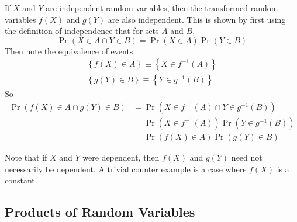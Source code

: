 \documentclass[11pt]{report} %
\begin{document}
If $X$ and $Y$ are independent random variables, then the transformed random variables $f\left(X\right)$ and $g\left(Y\right)$ are also independent. This is shown by first using the definition of independence that for sets $A$ and $B$, 
\begin{equation}
\operatorname{Pr}\left(X \in A \cap Y \in B\right) = \operatorname{Pr}\left(X \in A\right)\operatorname{Pr}\left(Y \in B\right)
\end{equation}
Then note the equivalence of events
\begin{gather}
\left\{f\left(X\right) \in A\right\} \equiv \left\{X \in f^{-1}\left(A\right)\right\} \\
\left\{g\left(Y\right) \in B\right\} \equiv \left\{Y \in g^{-1}\left(B\right)\right\}
\end{gather}
So
\begin{align}
\operatorname{Pr}\left(f\left(X\right) \in A \cap g\left(Y\right) \in B\right) &= \operatorname{Pr}\left(X \in f^{-1}\left(A\right) \cap Y \in g^{-1}\left(B\right)\right) \\
&=  \operatorname{Pr}\left(X \in f^{-1}\left(A\right)\right)\operatorname{Pr}\left(Y \in g^{-1}\left(B\right)\right) \\
&= \operatorname{Pr}\left(f\left(X\right) \in A\right)\operatorname{Pr}\left(g\left(Y\right) \in B\right)
\end{align}

Note that if $X$ and $Y$ were dependent, then $f\left(X\right)$ and $g\left(Y\right)$ need not necessarily be dependent. A trivial counter example is a case where $f\left(X\right)$ is a constant.

\subsection{Products of Random Variables}
\end{document}
